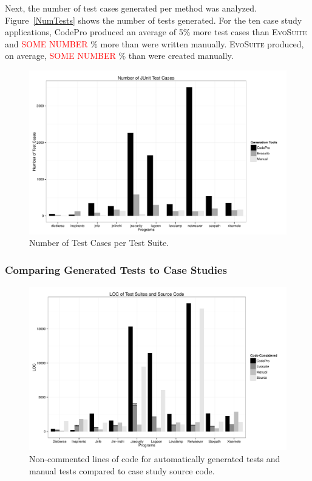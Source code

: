 Next, the number of test cases generated per method was analyzed.  Figure~\ref{NumTests} shows the number of tests generated.  For the ten case study applications, CodePro produced an average of  5\% more test cases than \textsc{EvoSuite} and \textcolor{red}{SOME NUMBER} \% more than were written manually.  \textsc{EvoSuite} produced, on average, \textcolor{red}{SOME NUMBER} \% than were created manually. 
\begin{figure}[!t]
\centering
  \includegraphics[width=\linewidth]{RGraphs/TestCasesGenerated.pdf}
    \caption{Number of Test Cases per Test Suite.}
  \label{fig:NumTests}
\end{figure}

\subsubsection{Comparing Generated Tests to Case Studies}
\begin{figure}[!t]
\centering
  \includegraphics[width=\linewidth]{RGraphs/LOC.pdf}
    \caption{Non-commented lines of code for automatically generated tests and manual tests compared to case study source code. }
  \label{fig:LOC}
\end{figure}

